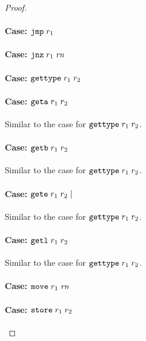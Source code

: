 \documentclass[a4paper]{article}
\begin{document}
\begin{proof}
\paragraph{Case: $\protect\tjmp{\trg{r_1}}$}

\paragraph{Case: $\protect\tjnz{\trg{r_1}}{\trg{\rn}}$}

\paragraph{Case: $\protect\tisptr{\trg{r_1}}{\trg{r_2}}$}

\paragraph{Case: $\protect\tgeta{\trg{r_1}}{\trg{r_2}}$}
Similar to the case for $\tisptr{\trg{r_1}}{\trg{r_2}}$.

\paragraph{Case: $\protect\tgetb{\trg{r_1}}{\trg{r_2}}$}
Similar to the case for $\tisptr{\trg{r_1}}{\trg{r_2}}$.

\paragraph{Case: $\protect\tgete{\trg{r_1}}{\trg{r_2}}\mid$}
Similar to the case for $\tisptr{\trg{r_1}}{\trg{r_2}}$.

\paragraph{Case: $\protect\tgetlin{\trg{r_1}}{\trg{r_2}}$}
Similar to the case for $\tisptr{\trg{r_1}}{\trg{r_2}}$.

\paragraph{Case: $\protect\tmove{\trg{r_1}}{\trg{\rn}}$}

\paragraph{Case: $\protect\tstore{\trg{r_1}}{\trg{r_2}}$}


\end{proof}
\end{document}
